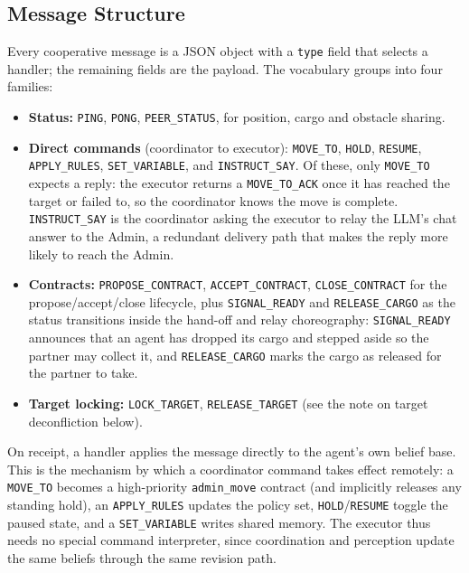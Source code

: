 \documentclass[a4paper,11pt]{article}
\begin{document}
\subsection{Message Structure}

Every cooperative message is a JSON object with a \texttt{type} field that selects a
handler; the remaining fields are the payload. The vocabulary groups into four
families:

\begin{itemize}
  \item \textbf{Status:} \texttt{PING}, \texttt{PONG}, \texttt{PEER\_STATUS}, for
        position, cargo and obstacle sharing.
  \item \textbf{Direct commands} (coordinator to executor): \texttt{MOVE\_TO},
        \texttt{HOLD}, \texttt{RESUME}, \texttt{APPLY\_RULES}, \texttt{SET\_VARIABLE},
        and \texttt{INSTRUCT\_SAY}. Of these, only \texttt{MOVE\_TO} expects a reply:
        the executor returns a \texttt{MOVE\_TO\_ACK} once it has reached the target
        or failed to, so the coordinator knows the move is complete.
        \texttt{INSTRUCT\_SAY} is the coordinator asking the executor to relay the
        LLM's chat answer to the Admin, a redundant delivery path that makes the
        reply more likely to reach the Admin.
  \item \textbf{Contracts:} \texttt{PROPOSE\_CONTRACT}, \texttt{ACCEPT\_CONTRACT},
        \texttt{CLOSE\_CONTRACT} for the propose/accept/close lifecycle, plus
        \texttt{SIGNAL\_READY} and \texttt{RELEASE\_CARGO} as the status transitions
        inside the hand-off and relay choreography: \texttt{SIGNAL\_READY} announces
        that an agent has dropped its cargo and stepped aside so the partner may
        collect it, and \texttt{RELEASE\_CARGO} marks the cargo as released for the
        partner to take.
  \item \textbf{Target locking:} \texttt{LOCK\_TARGET}, \texttt{RELEASE\_TARGET}
        (see the note on target deconfliction below).
\end{itemize}

On receipt, a handler applies the message directly to the agent's own belief base.
This is the mechanism by which a coordinator command takes effect remotely: a
\texttt{MOVE\_TO} becomes a high-priority \texttt{admin\_move} contract (and
implicitly releases any standing hold), an \texttt{APPLY\_RULES} updates the policy
set, \texttt{HOLD}/\texttt{RESUME} toggle the paused state, and a \texttt{SET\_VARIABLE}
writes shared memory. The executor thus needs no special command interpreter, since
coordination and perception update the same beliefs through the same revision path.
\end{document}
